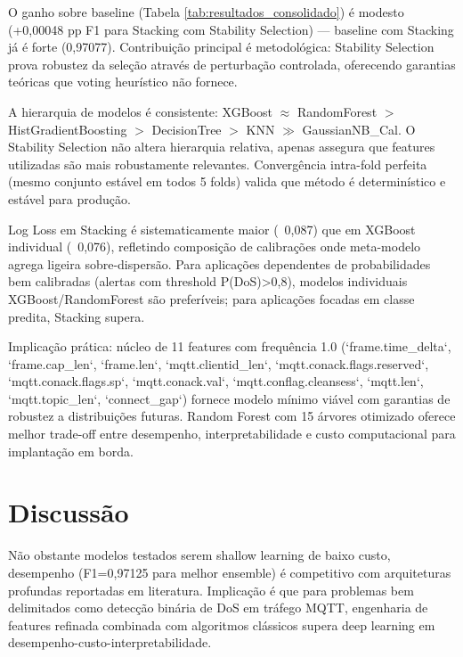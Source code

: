 \documentclass[12pt]{article}
\begin{document}
O ganho sobre baseline (Tabela \ref{tab:resultados_consolidado}) é modesto (+0,00048 pp F1 para Stacking com Stability Selection) — baseline com Stacking já é forte (0,97077). Contribuição principal é metodológica: Stability Selection prova robustez da seleção através de perturbação controlada, oferecendo garantias teóricas que voting heurístico não fornece.

A hierarquia de modelos é consistente: XGBoost $\approx$ RandomForest $>$ HistGradientBoosting $>$ DecisionTree $>$ KNN $\gg$ GaussianNB\_Cal. O  Stability Selection não altera hierarquia relativa, apenas assegura que features utilizadas são mais robustamente relevantes. Convergência intra-fold perfeita (mesmo conjunto estável em todos 5 folds) valida que método é determinístico e estável para produção.

Log Loss em Stacking é sistematicamente maior (~0,087) que em XGBoost individual (~0,076), refletindo composição de calibrações onde meta-modelo agrega ligeira sobre-dispersão. Para aplicações dependentes de probabilidades bem calibradas (alertas com threshold P(DoS)>0,8), modelos individuais XGBoost/RandomForest são preferíveis; para aplicações focadas em classe predita, Stacking supera.

Implicação prática: núcleo de 11 features com frequência 1.0 (`frame.time\_delta`, `frame.cap\_len`, `frame.len`, `mqtt.clientid\_len`, `mqtt.conack.flags.reserved`, `mqtt.conack.flags.sp`, `mqtt.conack.val`, `mqtt.conflag.cleansess`, `mqtt.len`, `mqtt.topic\_len`, `connect\_gap`) fornece modelo mínimo viável com garantias de robustez a distribuições futuras. Random Forest com 15 árvores otimizado oferece melhor trade-off entre desempenho, interpretabilidade e custo computacional para implantação em borda.


\section{Discussão}

Não obstante modelos testados serem shallow learning de baixo custo, desempenho (F1=0,97125 para melhor ensemble) é competitivo com arquiteturas profundas reportadas em literatura. Implicação é que para problemas bem delimitados como detecção binária de DoS em tráfego MQTT, engenharia de features refinada combinada com algoritmos clássicos supera deep learning em desempenho-custo-interpretabilidade.
\end{document}
